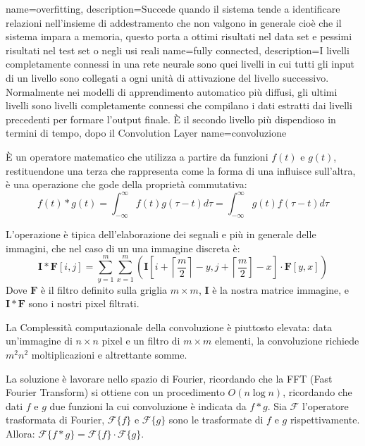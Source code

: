 {
    name=overfitting,
    description={Succede quando il sistema tende a identificare relazioni nell’insieme di addestramento che non valgono in generale cioè che il sistema impara a memoria, questo porta a ottimi risultati nel data set e pessimi risultati nel test set o negli usi reali}
}
{
    name={fully connected},
    description={I livelli completamente connessi in una rete neurale sono quei livelli in cui tutti gli input di
            un livello sono collegati a ogni unità di attivazione del livello successivo. Normalmente nei modelli di
            apprendimento automatico più diffusi, gli ultimi livelli sono livelli completamente connessi
            che compilano i dati estratti dai livelli precedenti per formare l’output finale. È il secondo
            livello più dispendioso in termini di tempo, dopo il Convolution Layer}
}
{
    name=convoluzione}{
    È un operatore matematico che utilizza a partire da  funzioni \(f(t)\) e \(g(t)\), restituendone una terza che rappresenta come la forma di una influisce sull’altra,  è una operazione che gode della proprietà commutativa:
    \[ f ( t ) * g ( t ) = \int _ { - \infty } ^ { \infty } f ( t ) g ( \tau - t ) d \tau  = \int _ { - \infty } ^ { \infty } g ( t ) f ( \tau - t ) d \tau\]

    L'operazione è tipica dell'elaborazione dei segnali e più in generale delle immagini, che nel caso di un una immagine discreta è:\[ \mathbf { I } * \mathbf{F} [ i , j ] = \sum _ { y = 1 } ^ { m } \sum _ { x = 1 } ^ { m } \left( \mathbf { I } \left[ i + \left\lceil \frac { m } { 2 } \right\rceil - y , j + \left\lceil \frac { m } { 2 } \right] - x \right] \cdot \mathbf { F } [ y , x ] \right) \]
    Dove \(\mathbf{F}\) è il filtro definito sulla griglia \(m \times m\), \(\mathbf{I}\) è la nostra matrice immagine, e \(\mathbf { I } * \mathbf{F}\) sono i nostri pixel filtrati.

    La Complessità
    computazionale  della convoluzione è
    piuttosto elevata: data
    un’immagine di \(n\times n\)
    pixel e un filtro di
    \(m\times m\)
    elementi, la
    convoluzione
    richiede \(m^2 n^2\)
    moltiplicazioni e
    altrettante somme.

    La soluzione è lavorare nello spazio di Fourier, ricordando che la FFT (Fast Fourier Transform) si ottiene con un procedimento \(O(n \log n)\), ricordando che dati \( f \) e \( g \) due funzioni la cui convoluzione è indicata da \( f * g \). Sia \( \mathcal { F } \) l'operatore trasformata di Fourier,  \( \mathcal { F } \{ f \} \) e \( \mathcal { F } \{ g \} \) sono le trasformate di \( f \) e \( g \) rispettivamente. Allora:
    \( \mathcal { F } \{ f * g \} = \mathcal { F } \{ f \} \cdot \mathcal { F } \{ g \} \).}


